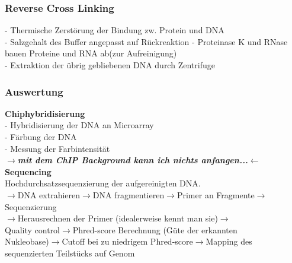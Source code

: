 \subsubsection{Reverse Cross Linking}
\hspace*{10mm}-	Thermische Zerstörung der Bindung zw. Protein und DNA\\
\hspace*{10mm}- Salzgehalt des Buffer angepasst auf Rückreaktion
\hspace*{10mm}-	Proteinase K und RNase bauen Proteine und RNA ab(zur Aufreinigung)\\
\hspace*{10mm}-	Extraktion der übrig gebliebenen DNA durch Zentrifuge\\

\subsubsection{Auswertung}
\hspace*{10mm}\textbf{Chiphybridisierung}\\
\hspace*{20mm}- Hybridisierung der DNA an Microarray\\
\hspace*{20mm}- Färbung der DNA\\
\hspace*{20mm}- Messung der Farbintensität\\
$\rightarrow$\textit{\textbf{mit dem ChIP Background kann ich nichts anfangen...}}$\leftarrow$\\
\hspace*{10mm}\textbf{Sequencing}\\
\hspace*{20mm}Hochdurchsatzsequenzierung der aufgereinigten DNA.\\
\hspace*{20mm}$\rightarrow$DNA extrahieren$\rightarrow$DNA fragmentieren$\rightarrow$Primer an Fragmente$\rightarrow$Sequenzierung\\
\hspace*{20mm}$\rightarrow$Herausrechnen der Primer (idealerweise kennt man sie)$\rightarrow$\\
\hspace*{20mm}Quality control$\rightarrow$Phred-score Berechnung (Güte der erkannten\\
\hspace*{20mm}Nukleobase)$\rightarrow$Cutoff bei zu niedrigem Phred-score$\rightarrow$Mapping des\\
\hspace*{20mm}sequenzierten Teilstücks auf Genom

